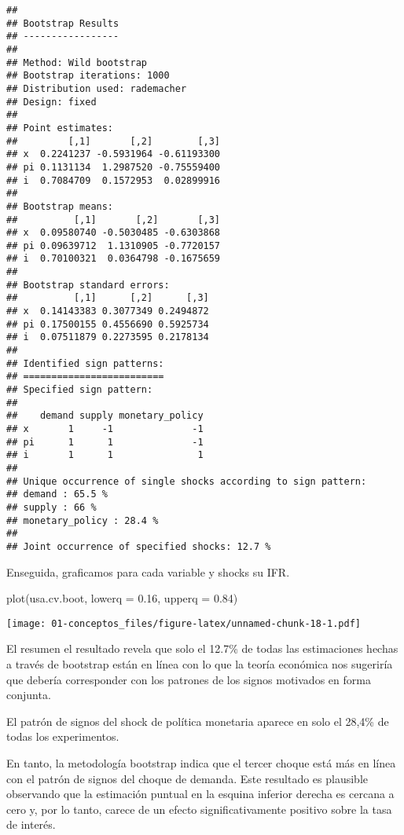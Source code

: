 \documentclass[
]{book}
\newenvironment{Shaded}{\begin{snugshade}}{\end{snugshade}}
\newcommand{\AttributeTok}[1]{\textcolor[rgb]{0.77,0.63,0.00}{#1}}
\newcommand{\FloatTok}[1]{\textcolor[rgb]{0.00,0.00,0.81}{#1}}
\newcommand{\FunctionTok}[1]{\textcolor[rgb]{0.00,0.00,0.00}{#1}}
\newcommand{\NormalTok}[1]{#1}
\begin{document}
\begin{verbatim}
## 
## Bootstrap Results
## ----------------- 
## 
## Method: Wild bootstrap
## Bootstrap iterations: 1000
## Distribution used: rademacher
## Design: fixed
## 
## Point estimates: 
##         [,1]       [,2]        [,3]
## x  0.2241237 -0.5931964 -0.61193300
## pi 0.1131134  1.2987520 -0.75559400
## i  0.7084709  0.1572953  0.02899916
## 
## Bootstrap means: 
##          [,1]       [,2]       [,3]
## x  0.09580740 -0.5030485 -0.6303868
## pi 0.09639712  1.1310905 -0.7720157
## i  0.70100321  0.0364798 -0.1675659
## 
## Bootstrap standard errors: 
##          [,1]      [,2]      [,3]
## x  0.14143383 0.3077349 0.2494872
## pi 0.17500155 0.4556690 0.5925734
## i  0.07511879 0.2273595 0.2178134
## 
## Identified sign patterns: 
## =========================
## Specified sign pattern: 
## 
##    demand supply monetary_policy
## x       1     -1              -1
## pi      1      1              -1
## i       1      1               1
## 
## Unique occurrence of single shocks according to sign pattern: 
## demand : 65.5 % 
## supply : 66 % 
## monetary_policy : 28.4 % 
## 
## Joint occurrence of specified shocks: 12.7 %
\end{verbatim}

Enseguida, graficamos para cada variable y shocks su IFR.

\begin{Shaded}
\begin{Highlighting}[]
\FunctionTok{plot}\NormalTok{(usa.cv.boot, }\AttributeTok{lowerq =} \FloatTok{0.16}\NormalTok{, }\AttributeTok{upperq =} \FloatTok{0.84}\NormalTok{)}
\end{Highlighting}
\end{Shaded}

\texttt{[image: 01-conceptos\_files/figure-latex/unnamed-chunk-18-1.pdf]}

El resumen el resultado revela que solo el 12.7\% de todas las estimaciones hechas a través de bootstrap están en línea con lo que la teoría económica nos sugeriría que debería corresponder con los patrones de los signos motivados en forma conjunta.

El patrón de signos del shock de política monetaria aparece en solo el 28,4\% de todas los experimentos.

En tanto, la metodología bootstrap indica que el tercer choque está más en línea con el patrón de signos del choque de demanda. Este resultado es plausible observando que la estimación puntual en la esquina inferior derecha es cercana a cero y, por lo tanto, carece de un efecto significativamente positivo sobre la tasa de interés.
\end{document}
